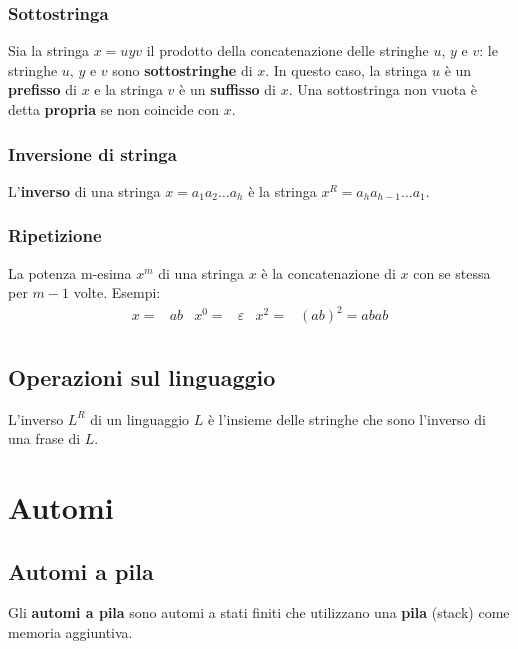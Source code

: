 \documentclass[11pt]{article}
\begin{document}
\subsubsection{Sottostringa}
Sia la stringa $x=uyv$ il prodotto della concatenazione delle stringhe $u$, $y$ e $v$: le stringhe $u$, $y$ e $v$ sono 
\textbf{sottostringhe} di $x$. In questo caso, la stringa $u$ è un \textbf{prefisso} di $x$ e la stringa $v$ è un 
\textbf{suffisso} di $x$. Una sottostringa non vuota è detta \textbf{propria} se non coincide con $x$.
\subsubsection{Inversione di stringa}
L'\textbf{inverso} di una stringa $x=a_1a_2\dots a_h$ è la stringa $x^R=a_ha_{h-1}\dots a_1$.
\subsubsection{Ripetizione}
La potenza m-esima $x^m$ di una stringa $x$ è la concatenazione di $x$ con se stessa per $m-1$ volte. Esempi:
\begin{align*}
    x=&ab    &   x^0=&\varepsilon    &   x^2=&(ab)^2=abab\\  
\end{align*}
\subsection{Operazioni sul linguaggio}
L'inverso $L^R$ di un linguaggio $L$ è l'insieme delle stringhe che sono l'inverso di una frase di $L$.

\section{Automi}
\subsection{Automi a pila}
Gli \textbf{automi a pila} sono automi a stati finiti che utilizzano una \textbf{pila} (stack) come memoria aggiuntiva.
\end{document}
